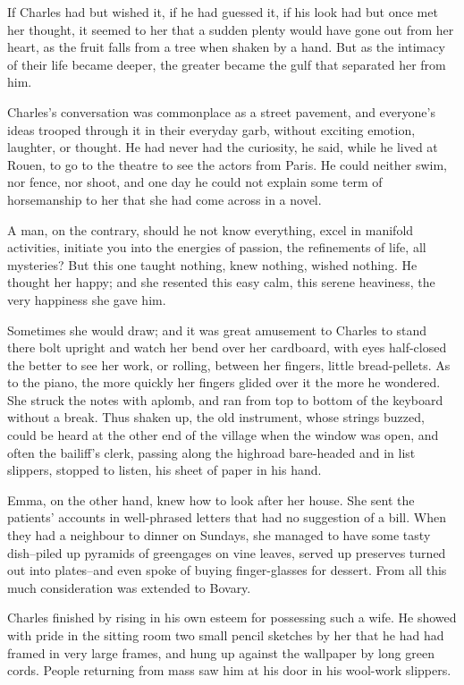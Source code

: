 \documentclass{tufte-book}
\begin{document}
If Charles had but wished it, if he had guessed it, if his look had but
once met her thought, it seemed to her that a sudden plenty would have
gone out from her heart, as the fruit falls from a tree when shaken by
a hand. But as the intimacy of their life became deeper, the greater
became the gulf that separated her from him.

Charles's conversation was commonplace as a street pavement, and
everyone's ideas trooped through it in their everyday garb, without
exciting emotion, laughter, or thought. He had never had the curiosity,
he said, while he lived at Rouen, to go to the theatre to see the actors
from Paris. He could neither swim, nor fence, nor shoot, and one day
he could not explain some term of horsemanship to her that she had come
across in a novel.

A man, on the contrary, should he not know everything, excel in manifold
activities, initiate you into the energies of passion, the refinements
of life, all mysteries? But this one taught nothing, knew nothing,
wished nothing. He thought her happy; and she resented this easy calm,
this serene heaviness, the very happiness she gave him.

Sometimes she would draw; and it was great amusement to Charles to stand
there bolt upright and watch her bend over her cardboard, with eyes
half-closed the better to see her work, or rolling, between her fingers,
little bread-pellets. As to the piano, the more quickly her fingers
glided over it the more he wondered. She struck the notes with aplomb,
and ran from top to bottom of the keyboard without a break. Thus shaken
up, the old instrument, whose strings buzzed, could be heard at the
other end of the village when the window was open, and often the
bailiff's clerk, passing along the highroad bare-headed and in list
slippers, stopped to listen, his sheet of paper in his hand.

Emma, on the other hand, knew how to look after her house. She sent the
patients' accounts in well-phrased letters that had no suggestion of
a bill. When they had a neighbour to dinner on Sundays, she managed to
have some tasty dish--piled up pyramids of greengages on vine leaves,
served up preserves turned out into plates--and even spoke of buying
finger-glasses for dessert. From all this much consideration was
extended to Bovary.

Charles finished by rising in his own esteem for possessing such a wife.
He showed with pride in the sitting room two small pencil sketches by
her that he had had framed in very large frames, and hung up against the
wallpaper by long green cords. People returning from mass saw him at his
door in his wool-work slippers.
\end{document}
